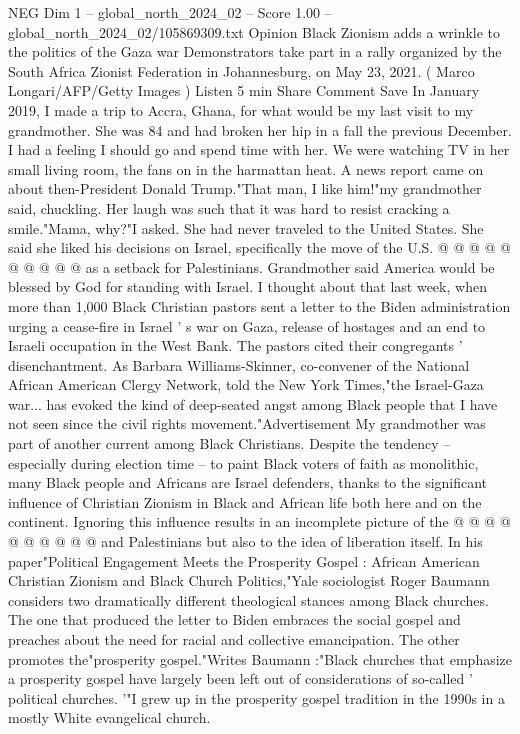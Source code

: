 \begin{textsample}{NEG Dim 1 – global\_north\_2024\_02 – Score 1.00 – global\_north\_2024\_02/105869309.txt}  \label{ex:f1_neg_357}
Opinion Black Zionism adds a wrinkle to the politics of the Gaza war Demonstrators take part in a rally organized by the South Africa Zionist Federation in Johannesburg, on May 23, 2021. ( Marco Longari/AFP/Getty Images ) Listen 5 min Share Comment Save In January 2019, I made a trip to Accra, Ghana, for what would be my last visit to my grandmother.
She was 84 and had broken her hip in a fall the previous December.
I had a feeling I should go and spend time with her.
We were watching TV in her small living room, the fans on in the harmattan heat.
A news report came on about then-President Donald Trump."That man, I like him!"my grandmother said, chuckling.
Her laugh was such that it was hard to resist cracking a smile."Mama, why?"I asked.
She had never traveled to the United States.
She said she liked his decisions on Israel, specifically the move of the U.S. @ @ @ @ @ @ @ @ @ @ as a setback for Palestinians.
Grandmother said America would be blessed by God for standing with Israel.
I thought about that last week, when more than 1,000 Black Christian pastors sent a letter to the Biden administration urging a cease-fire in Israel ' s war on Gaza, release of hostages and an end to Israeli occupation in the West Bank.
The pastors cited their congregants ' disenchantment.
As Barbara Williams-Skinner, co-convener of the National African American Clergy Network, told the New York Times,"the Israel-Gaza war... has evoked the kind of deep-seated angst among Black people that I have not seen since the civil rights movement."Advertisement My grandmother was part of another current among Black Christians.
Despite the tendency -- especially during election time -- to paint Black voters of faith as monolithic, many Black people and Africans are Israel defenders, thanks to the significant influence of Christian Zionism in Black and African life both here and on the continent.
Ignoring this influence results in an incomplete picture of the @ @ @ @ @ @ @ @ @ @ and Palestinians but also to the idea of liberation itself.
In his paper"Political Engagement Meets the Prosperity Gospel : African American Christian Zionism and Black Church Politics,"Yale sociologist Roger Baumann considers two dramatically different theological stances among Black churches.
The one that produced the letter to Biden embraces the social gospel and preaches about the need for racial and collective emancipation.
The other promotes the"prosperity gospel."Writes Baumann :"Black churches that emphasize a prosperity gospel have largely been left out of considerations of so-called ' political churches. '"I grew up in the prosperity gospel tradition in the 1990s in a mostly White evangelical church.

\end{textsample}
